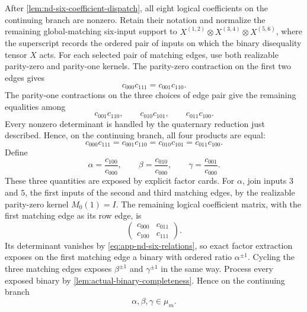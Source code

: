 \documentclass[11pt,letterpaper,onecolumn]{article}
\theoremstyle{plain}
\theoremstyle{definition}
\theoremstyle{remark}
\begin{document}
After \cref{lem:nd-six-coefficient-dispatch}, all eight logical
coefficients on the continuing branch are nonzero.  Retain their notation and
normalize the remaining global-matching six-input support to
\(X^{(1,2)}\otimes X^{(3,4)}\otimes X^{(5,6)}\), where the superscript records
the ordered pair of inputs on which the binary disequality tensor \(X\) acts.
For each selected pair of matching edges, use both realizable parity-zero and
parity-one kernels.  The parity-zero contraction on the first two edges
gives
\[
 c_{000}c_{111}=c_{001}c_{110}.
\]
The parity-one contractions on the three choices of edge pair give the
remaining equalities among
\[
 c_{001}c_{110},\qquad
 c_{010}c_{101},\qquad
 c_{011}c_{100}.
\]
Every nonzero determinant is handled by the quaternary reduction just described.  Hence, on the continuing branch, all four products are equal:
\begin{equation}
  c_{000}c_{111}
  =c_{001}c_{110}
  =c_{010}c_{101}
  =c_{011}c_{100}.
  \label{eq:app-nd-six-relations}
\end{equation}
Define
\[
  \alpha=\frac{c_{100}}{c_{000}},\qquad
  \beta=\frac{c_{010}}{c_{000}},\qquad
  \gamma=\frac{c_{001}}{c_{000}}.
\]
These three quantities are exposed by explicit factor cards.
For \(\alpha\), join inputs \(3\) and \(5\), the first inputs of the second
and third matching edges, by the realizable parity-zero kernel
\(M_0(1)=I\).  The remaining logical coefficient matrix, with the first matching edge
as its row edge, is
\[
 \begin{pmatrix}
 c_{000}&c_{011}\\
 c_{100}&c_{111}
 \end{pmatrix}.
\]
Its determinant vanishes by \cref{eq:app-nd-six-relations}, so exact factor
extraction exposes on the first matching edge a binary with ordered ratio
\(\alpha^{\pm1}\).  Cycling the three matching edges exposes
\(\beta^{\pm1}\) and \(\gamma^{\pm1}\) in the same way.  Process every exposed binary by \cref{lem:actual-binary-completeness}. Hence on the continuing
branch
\[
 \alpha,\beta,\gamma\in\mu_m.
\]
\end{document}
